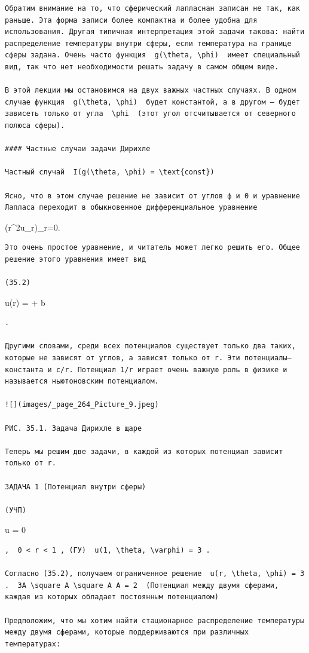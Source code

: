 \documentclass[
  ukrainian,
]{article}
\begin{document}
\begin{verbatim}
Обратим внимание на то, что сферический лапласнан записан не так, как раньше. Эта форма записи более компактна и более удобна для использования. Другая типичная интерпретация этой задачи такова: найти распределение температуры внутри сферы, если температура на границе сферы задана. Очень часто функция  g(\theta, \phi)  имеет специальный вид, так что нет необходимости решать задачу в самом общем виде.

В этой лекции мы остановимся на двух важных частных случаях. В одном случае функция  g(\theta, \phi)  будет константой, а в другом — будет зависеть только от угла  \phi  (этот угол отсчитывается от северного полюса сферы).

#### Частные случаи задачи Дирихле

Частный случай  I(g(\theta, \phi) = \text{const}) 

Ясно, что в этом случае решение не зависит от углов ф и 0 и уравнение Лапласа переходит в обыкновенное дифференциальное уравнение
\end{verbatim}

(r\^{}2u\_r)\_r=0.

\begin{verbatim}
Это очень простое уравнение, и читатель может легко решить его. Общее решение этого уравнения имеет вид

(35.2)
\end{verbatim}

u(r) =  + b

\begin{verbatim}
.

Другими словами, среди всех потенциалов существует только два таких, которые не зависят от углов, а зависят только от r. Эти потенциалы— константа и c/r. Потенциал 1/r играет очень важную роль в физике и называется ньютоновским потенциалом.

![](images/_page_264_Picture_9.jpeg)

РИС. 35.1. Задача Дирихле в щаре

Теперь мы решим две задачи, в каждой из которых потенциал зависит только от r.

ЗАДАЧА 1 (Потенциал внутри сферы)

(УЧП)
\end{verbatim}

\Delta u = 0

\begin{verbatim}
,  0 < r < 1 , (ГУ)  u(1, \theta, \varphi) = 3 .

Согласно (35.2), получаем ограниченное решение  u(r, \theta, \phi) = 3 .  3A \square A \square A A = 2  (Потенциал между двумя сферами, каждая из которых обладает постоянным потенциалом)

Предположим, что мы хотим найти стационарное распределение температуры между двумя сферами, которые поддерживаются при различных температурах:
\end{verbatim}
\end{document}
